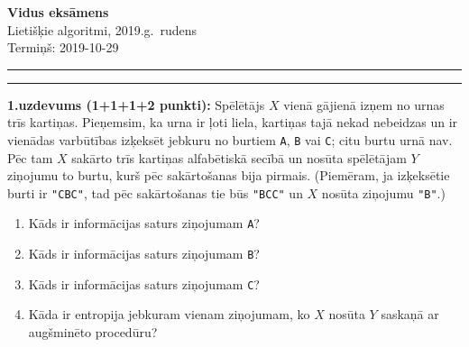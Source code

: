 \documentclass[a4paper,12pt]{article}
\begin{document}
\thispagestyle{empty}

\begin{center}
{\bf\Huge Vidus eksāmens} \\[5pt]
Lietišķie algoritmi, 2019.g.\ rudens\\
Termiņš: 2019-10-29
\end{center}

\hrule
\vspace{2pt}
\hrule
\vspace{12pt}





\noindent
{\bf 1.uzdevums (1+1+1+2 punkti):}
Spēlētājs $X$ vienā gājienā izņem no urnas trīs kartiņas. 
Pieņemsim, ka urna ir ļoti liela, kartiņas tajā nekad nebeidzas un ir vienādas varbūtības
izķeksēt jebkuru no burtiem {\tt A}, {\tt B} vai {\tt C}; citu burtu urnā nav.
Pēc tam $X$ sakārto trīs kartiņas alfabētiskā secībā un nosūta spēlētājam $Y$ ziņojumu \textendash{} to burtu, kurš 
pēc sakārtošanas bija pirmais. (Piemēram, ja izķeksētie burti ir {\tt "CBC"}, tad pēc sakārtošanas tie būs {\tt "BCC"} un 
$X$ nosūta ziņojumu {\tt "B"}.) 
\begin{enumerate}
\item Kāds ir informācijas saturs ziņojumam {\tt A}?
\item Kāds ir informācijas saturs ziņojumam {\tt B}? 
\item Kāds ir informācijas saturs ziņojumam {\tt C}? 
\item Kāda ir entropija jebkuram vienam ziņojumam, ko $X$ nosūta $Y$ saskaņā ar augšminēto procedūru?
\end{enumerate}
\end{document}
